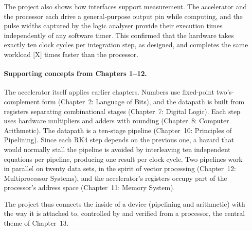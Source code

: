 The project also shows how interfaces support measurement. The accelerator and the processor each
drive a general-purpose output pin while computing, and the pulse widths captured by the logic
analyser provide their execution times independently of any software timer. This confirmed that
the hardware takes exactly ten clock cycles per integration step, as designed, and completes the
same workload [X] times faster than the processor.

\paragraph{Supporting concepts from Chapters 1--12.}
The accelerator itself applies earlier chapters. Numbers use fixed-point two's-complement form
(Chapter~2: Language of Bits), and the datapath is built from registers separating combinational
stages (Chapter~7: Digital Logic). Each step uses hardware multipliers and adders with rounding
(Chapter~8: Computer Arithmetic). The datapath is a ten-stage pipeline (Chapter~10: Principles of
Pipelining). Since each RK4 step depends on the previous one, a \gls{hazard} that would normally
stall the pipeline is avoided by interleaving ten independent equations per pipeline, producing
one result per clock cycle. Two pipelines work in parallel on twenty data sets, in the spirit of
vector processing (Chapter~12: Multiprocessor Systems), and the accelerator's registers occupy
part of the processor's address space (Chapter~11: Memory System).

The project thus connects the inside of a device (pipelining and arithmetic) with the way it is
attached to, controlled by and verified from a processor, the central theme of Chapter~13.

